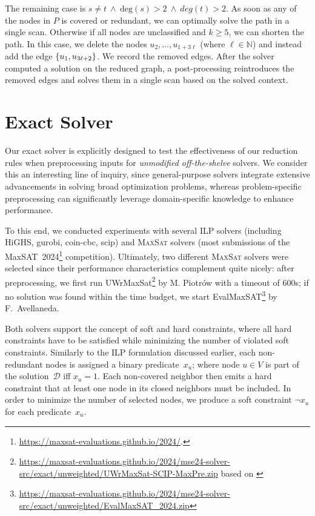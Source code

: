 \documentclass[a4paper, USenglish, cleveref, autoref, thm-restate, noalgorithm2e]{socg-lipics-v2021}
\newcommand{\set}[1]{\ensuremath\left\{#1\right\}}
\def\deg{\ensuremath{\mathrm{deg}}}
\newcommand{\MSat}{\textsc{MaxSat}\xspace}
\newcommand{\domset}{\ensuremath{\mathcal D}\xspace}
\begin{document}
The remaining case is $s \ne t \ \land\  \deg(s) > 2 \ \land\  deg(t) > 2$.
As soon as any of the nodes in $P$ is covered or redundant, we can optimally solve the path in a single scan.
Otherwise if all nodes are unclassified and $k\ge5$, we can shorten the path.
In this case, we delete the nodes $u_2, \ldots, u_{1+3\ell}$ (where $\ell \in \mathbb N$) and instead add the edge $\set{u_1, u_{3\ell + 2}}$.
We record the removed edges.
After the solver computed a solution on the reduced graph, a post-processing reintroduces the removed edges and solves them in a single scan based on the solved context.



\section{Exact Solver}\label{sec:exact}
Our exact solver is explicitly designed to test the effectiveness of our reduction rules when preprocessing inputs for \emph{unmodified off-the-shelve} solvers.
We consider this an interesting line of inquiry, since general-purpose solvers integrate extensive advancements in solving broad optimization problems, whereas problem-specific preprocessing can significantly leverage domain-specific knowledge to enhance performance.

To this end, we conducted experiments with several ILP solvers (including HiGHS, gurobi, coin-cbc, scip) and \MSat solvers (most submissions of the MaxSAT~2024\footnote{
    \url{https://maxsat-evaluations.github.io/2024/}.
} competition).
Ultimately, two different \MSat solvers were selected since their performance characteristics complement quite nicely:
after preprocessing, we first run UWrMaxSat\footnote{\url{https://maxsat-evaluations.github.io/2024/mse24-solver-src/exact/unweighted/UWrMaxSat-SCIP-MaxPre.zip} based on \cite{DBLP:conf/ictai/Piotrow20}} by M. Piotrów with a timeout of 600s;
if no solution was found within the time budget, we start EvalMaxSAT\footnote{\url{https://maxsat-evaluations.github.io/2024/mse24-solver-src/exact/unweighted/EvalMaxSAT_2024.zip}} by F.~Avellaneda.

Both solvers support the concept of soft and hard constraints, where all hard constraints have to be satisfied while minimizing the number of violated soft constraints.
Similarly to the ILP formulation discussed earlier, each non-redundant nodes is assigned a binary predicate~$x_u$; where node $u \in V$ is part of the solution~$\domset$ iff $x_u = 1$.
Each non-covered neighbor then emits a hard constraint that at least one node in its closed neighbors must be included.
In order to minimize the number of selected nodes, we produce a soft constraint $\lnot x_u$ for each predicate~$x_u$.
\end{document}
